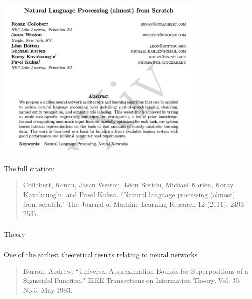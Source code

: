 \documentclass[xetex,mathserif,serif,aspectratio=169]{beamer}
\begin{document}
\begin{frame}[fragile] \frametitle{} \oldB \small

\begin{center}
\includegraphics[height=8cm]{img/nlpScratch.jpg}
\end{center}

\end{frame}

\begin{frame}[fragile] \frametitle{} \oldB \small

The full citation:
\begin{quote}
Collobert, Ronan, Jason Weston, Léon Bottou, Michael Karlen, Koray Kavukcuoglu, and Pavel Kuksa. ``Natural language processing (almost) from scratch." The Journal of Machine Learning Research 12 (2011): 2493-2537.
\end{quote}

\end{frame}

\begin{frame}[fragile] \frametitle{} \oldB \small

\begin{flushright}
{\color{yaleblue}\sc\fontsize{1cm}{0cm}\selectfont Theory}
\end{flushright}

\end{frame}

\begin{frame}[fragile] \frametitle{} \oldB \small

One of the earliest theoretical results relating to neural
networks:
\begin{quote}
Barron, Andrew. ``Universal Approximation Bounds for Superpositions
of a Sigmoidal Function." IEEE Transactions on Information Theory,
Vol. 39, No.3, May 1993.
\end{quote}

\end{frame}
\end{document}
